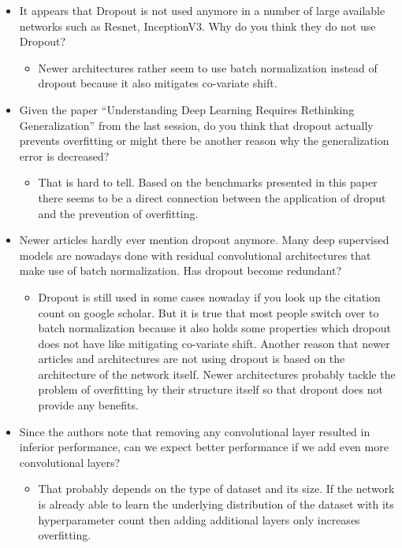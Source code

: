 \documentclass[a4paper]{article}
\begin{document}
\begin{itemize}
	
	
	
	
	\item It appears that Dropout is not used anymore in a number of large available networks such as Resnet, InceptionV3. Why do you think they do not use Dropout?
		\begin{itemize}
			\item Newer architectures rather seem to use batch normalization instead of dropout because it also mitigates co-variate shift.
		\end{itemize}
	
	
	\item Given the paper “Understanding Deep Learning Requires Rethinking Generalization” from the last session, do you think that dropout actually prevents overfitting or might there be another reason why the generalization error is decreased?
		\begin{itemize}
			\item That is hard to tell. Based on the benchmarks presented in this paper there seems to be a direct connection between the application of droput and the prevention of overfitting.
		\end{itemize}
	
	
	\item Newer articles hardly ever mention dropout anymore. Many deep supervised models are nowadays done with residual convolutional architectures that make use of batch normalization. Has dropout become redundant?
		\begin{itemize}
			\item Dropout is still used in some cases nowaday if you look up the citation count on google scholar. But it is true that most people switch over to batch normalization because it also holds some properties which dropout does not have like mitigating co-variate shift. Another reason that newer articles and architectures are not using dropout is based on the architecture of the network itself. Newer architectures probably tackle the problem of overfitting by their structure itself so that dropout does not provide any benefits.
		\end{itemize}	
	
	\item Since the authors note that removing any convolutional layer resulted in inferior performance, can we expect better performance if we add even more convolutional layers?
		\begin{itemize}
			\item That probably depends on the type of dataset and its size. If the network is already able to learn the underlying distribution of the dataset with its hyperparameter count then adding additional layers only increases overfitting. 
		\end{itemize}
	

\end{itemize}
\end{document}
